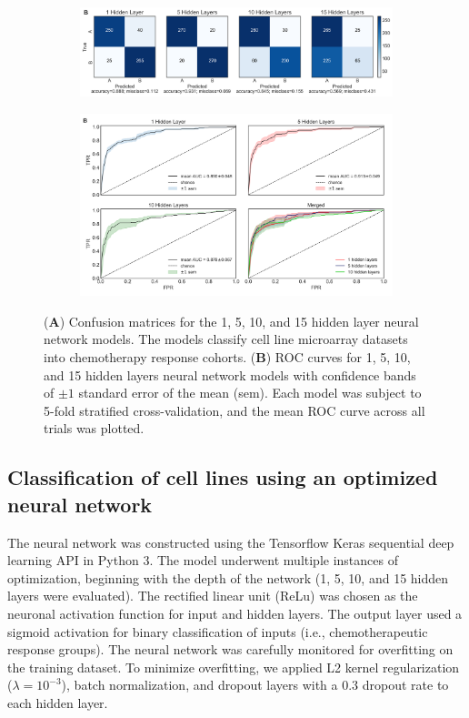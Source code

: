 \documentclass[10pt, letterpaper, twocolumn]{article}
\begin{document}
\begin{figure}[!ht]
    \centering
    \begin{subfigure}[t]{\textwidth}
        \centering
        \includegraphics[width=\textwidth]{Figures/confusion_matrix/cm_combined.png}
    \end{subfigure}

    \begin{subfigure}[t]{\textwidth}
        \centering
        \includegraphics[width=\textwidth]{Figures/roc/roc_combined.png}
    \end{subfigure}

    \caption{(\textbf{A}) Confusion matrices for the 1, 5, 10, and 15 hidden layer neural network models. The models classify cell line microarray datasets into chemotherapy response cohorts. (\textbf{B}) ROC curves for 1, 5, 10, and 15 hidden layers neural network models with confidence bands of $\pm 1$ standard error of the mean (sem). Each model was subject to 5-fold stratified cross-validation, and the mean ROC curve across all trials was plotted.}
    \label{fig:nnet}
\end{figure}


\subsection{Classification of cell lines using an optimized neural network}
The neural network was constructed using the Tensorflow Keras sequential deep learning API \cite{keras} in Python 3. The model underwent multiple instances of optimization, beginning with the depth of the network (1, 5, 10, and 15 hidden layers were evaluated). The rectified linear unit (ReLu) was chosen as the neuronal activation function for input and hidden layers. The output layer used a sigmoid activation for binary classification of inputs (i.e., chemotherapeutic response groups). The neural network was carefully monitored for overfitting on the training dataset. To minimize overfitting, we applied L2 kernel regularization ($\lambda=10^{-3}$), batch normalization, and dropout layers with a 0.3 dropout rate to each hidden layer.
\end{document}
